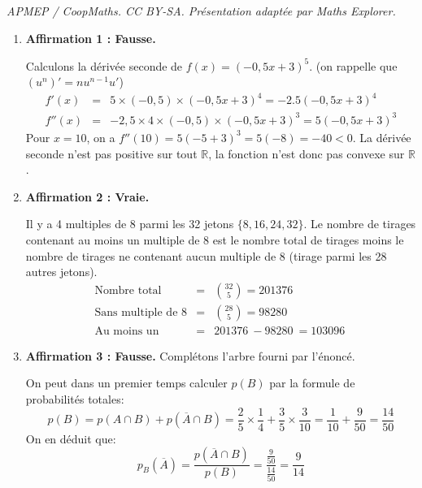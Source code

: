 \documentclass[10pt]{article}
\providecommand{\np}[2][]{{#2~#1}}
\begin{document}
\noindent\textit{APMEP / CoopMaths. CC BY-SA. Présentation adaptée par Maths Explorer.}\par\medskip
\begin{enumerate}
\item \textbf{Affirmation 1 : Fausse.}

Calculons la dérivée seconde de $f(x) = (-0,5x + 3)^5$. (on rappelle que $(u^n)'=nu^{n-1}u'$)
\[
\begin{array}{rcl}
f'(x) &=& 5 \times (-0,5) \times (-0,5x + 3)^4 = -2.5(-0,5x + 3)^4 \\
f''(x) &=& -2,5 \times 4 \times (-0,5) \times (-0,5x + 3)^3 = 5(-0,5x + 3)^3
\end{array}
\]
Pour $x = 10$, on a $f''(10) = 5(-5 + 3)^3 = 5(-8) = -40 < 0$. La dérivée seconde n'est pas positive sur tout $\mathbb{R}$, la fonction n'est donc pas convexe sur $\mathbb{R}$.

\item \textbf{Affirmation 2 : Vraie.} 

Il y a 4 multiples de 8 parmi les 32 jetons $\{8, 16, 24, 32\}$.
Le nombre de tirages contenant au moins un multiple de 8 est le nombre total de tirages moins le nombre de tirages ne contenant aucun multiple de 8 (tirage parmi les 28 autres jetons).
\[
\begin{array}{rcl}
\text{Nombre total} &=& \binom{32}{5} = 201376 \\
\text{Sans multiple de 8} &=& \binom{28}{5} = \np{98280} \\
\text{Au moins un} &=& \np{201376} - \np{98280} = \np{103096}
\end{array}
\]

\item \textbf{Affirmation 3 : Fausse.} Complétons l'arbre fourni par l'énoncé.

\begin{center}
\end{center}
On peut dans un premier temps calculer $p(B)$ par la formule de probabilités totales:\[
p(B)= p(A \cap B) + p\left(\overline{A} \cap B\right) = \frac25 \times \frac14 + \frac35 \times \frac3{10} =\frac1{10}+\frac9{50}= \frac{14}{50}
\]
On en déduit que: \[
p_B\left(\overline{A}\right)=\frac{p\left(\overline{A} \cap B\right)}{p(B)} =\frac{\frac9{50}}{\frac{14}{50}} = \frac9{14}
\]



\end{enumerate}
\end{document}

